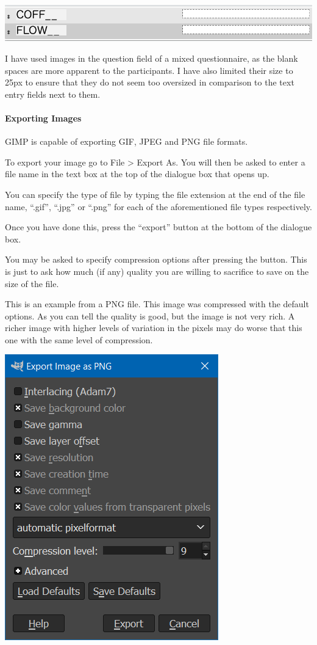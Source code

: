 \documentclass[]{book}
\let\oldparagraph\paragraph
\renewcommand{\paragraph}[1]{\oldparagraph{#1}\mbox{}}
\begin{document}
\includegraphics{images/screenshots/image_size_example.png}

I have used images in the question field of a mixed questionnaire, as
the blank spaces are more apparent to the participants. I have also
limited their size to 25px to ensure that they do not seem too oversized
in comparison to the text entry fields next to them.

\paragraph{Exporting Images}\label{exporting-images}

GIMP is capable of exporting GIF, JPEG and PNG file formats.

To export your image go to File \textgreater{} Export As. You will then
be asked to enter a file name in the text box at the top of the dialogue
box that opens up.

You can specify the type of file by typing the file extension at the end
of the file name, ``.gif'', ``.jpg'' or ``.png'' for each of the
aforementioned file types respectively.

Once you have done this, press the ``export'' button at the bottom of
the dialogue box.

You may be asked to specify compression options after pressing the
button. This is just to ask how much (if any) quality you are willing to
sacrifice to save on the size of the file.

This is an example from a PNG file. This image was compressed with the
default options. As you can tell the quality is good, but the image is
not very rich. A richer image with higher levels of variation in the
pixels may do worse that this one with the same level of compression.

\includegraphics{images/screenshots/export_1.png}
\end{document}
